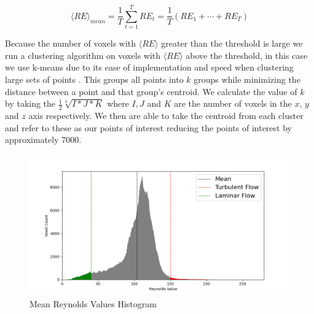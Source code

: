 \begin{equation} \label{eq:2}
\langle RE\rangle_{mean} = \frac{1}{T} \sum_{t=1}^{T} RE_{t}=\frac{1}{T}\left(RE_{1}+\cdots+RE_{T}\right)
\end{equation} 

Because the number of voxels with \ensuremath{\langle RE\rangle} greater than the threshold is large we run a clustering algorithm on voxels with \ensuremath{\langle RE\rangle} above the threshold, in this case we use k-means due to its ease of implementation and speed when clustering large sets of points \cite{HDBScan}. This groups all points into \ensuremath{k} groups while minimizing the distance between a point and that group’s centroid. We calculate the value of \ensuremath{k} by taking the \ensuremath{\frac{1}{2}\sqrt[3]{I*J*K}} where \ensuremath{I,J} and \ensuremath{K} are the number of voxels in the \ensuremath{x}, \ensuremath{y} and \ensuremath{z} axis respectively. We then are able to take the centroid from each cluster and refer to these as our points of interest reducing the points of interest by approximately 7000.




\begin{figure}
\centering
\includegraphics[scale=.35]{Figures/Hist4_11.png}
\decoRule
\caption[Reynolds Number Histogram]{Mean Reynolds Values Histogram}
\label{fig:MHistgram}
\end{figure}

